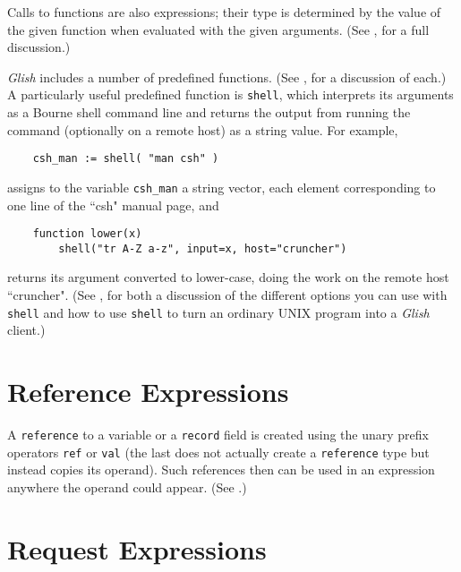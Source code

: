 Calls to functions are also expressions; their type is determined
by the value of the given function when evaluated with the given
arguments. (See , for a full discussion.)

{\em Glish} includes a number of predefined functions.  (See ,
for a discussion of each.)  A particularly useful predefined function
is {\tt shell}, which 
interprets its arguments as a Bourne shell command line and returns
the output from running the command (optionally on a remote host)
as a string value.  For example,
\begin{verbatim}
    csh_man := shell( "man csh" )
\end{verbatim}
assigns to the variable \verb+csh_man+ a string vector, each element
corresponding to one line of the ``csh" manual page, and
\begin{verbatim}
    function lower(x)
        shell("tr A-Z a-z", input=x, host="cruncher")
\end{verbatim}
returns its argument converted to lower-case, doing the work
on the remote host ``cruncher".  (See , for both
a discussion of the different options you can use with {\tt shell}
and how to use {\tt shell} to turn an ordinary UNIX program into
a {\em Glish} client.)

\section{Reference Expressions}

A {\tt reference} to a variable or a {\tt record} field is created
using the unary prefix operators {\tt ref} or {\tt val}
(the last does not actually create a {\tt reference} type but
instead copies its operand).  Such references then can be used in
an expression anywhere the operand could appear.  (See .)

\section{Request Expressions}
\label{send-event-expr}


